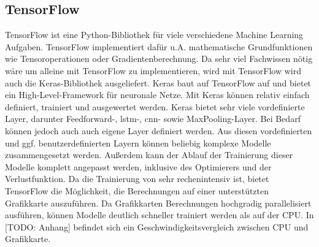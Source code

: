 \subsection{TensorFlow}
\label{sec:TensorFlow}

TensorFlow ist eine Python-Bibliothek für viele verschiedene Machine Learning Aufgaben.
TensorFlow implementiert dafür u.A. mathematische Grundfunktionen wie Tensoroperationen oder Gradientenberechnung.
Da sehr viel Fachwissen nötig wäre um alleine mit TensorFlow  zu implementieren, wird mit TensorFlow wird auch die Keras-Bibliothek ausgeliefert.
Keras baut auf TensorFlow auf und bietet ein High-Level-Framework für neuronale Netze.
Mit Keras können  relativ einfach definiert, trainiert und ausgewertet werden.
Keras bietet sehr viele vordefinierte Layer, darunter Feedforward-, \acrshort{lstm}-, \acrshort{cnn}- sowie MaxPooling-Layer.
Bei Bedarf können jedoch auch auch eigene Layer definiert werden.
Aus diesen vordefinierten und ggf. benutzerdefinierten Layern können beliebig komplexe Modelle zusammengesetzt werden.
Außerdem kann der Ablauf der Trainierung dieser Modelle komplett angepasst werden, inklusive des Optimierers und der Verlustfunktion.
Da die Trainierung von  sehr rechenintensiv ist, bietet TensorFlow die Möglichkeit, die Berechnungen auf einer unterstützten Grafikkarte auszuführen.
Da Grafikkarten Berechnungen hochgradig parallelisiert ausführen, können Modelle deutlich schneller trainiert werden als auf der CPU.
In [TODO: Anhang] befindet sich ein Geschwindigkeitsvergleich zwischen CPU und Grafikkarte.
